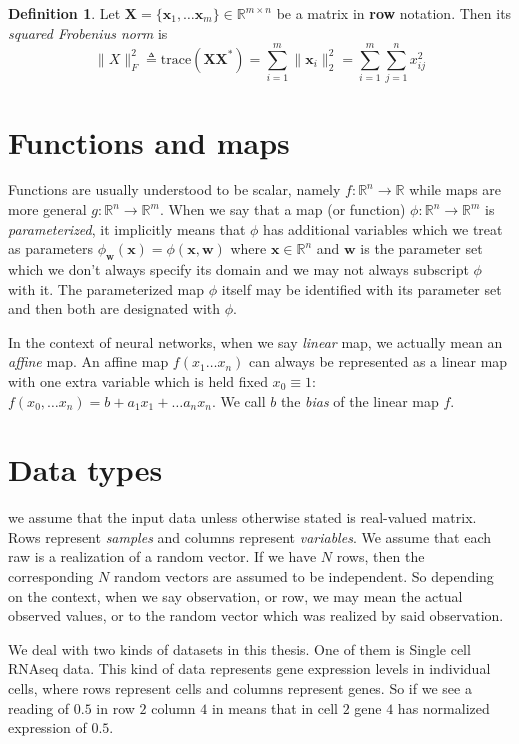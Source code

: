 \documentclass[11pt, a4paper]{report}
\theoremstyle{plain}
\theoremstyle{definition}
\newtheorem{mydef}{Definition}[chapter]
\theoremstyle{remark}
\newcommand{\R}{\mathbb{R}}
\newcommand{\X}{\mathbf{X}}
\newcommand{\x}{\mathbf{x}}
\newcommand{\w}{\mathbf{w}}
\begin{document}
\begin{mydef}
Let $\X = \{\x_1, \dots \x_m\} \in \R^{m \times n}$
be a matrix in \textbf{row} notation. Then its \emph{squared Frobenius norm} is
\begin{equation}
\label{def:frobnorm}
\|X\|_F^2 \triangleq \text{trace}(\X \X^*) 
= \sum_{i=1}^{m} \|\x_i\|^2_2 = \sum_{i=1}^m \sum_{j=1}^n x_{ij}^2
\end{equation}
\end{mydef}



\section{Functions and maps}
\label{seq:functions}
Functions are usually understood to be scalar, namely $f:\R^n \to \R$ while maps
are more general $g:\R^n \to \R^m$. When we say that a map (or function) $\phi
:\R^n \to \R^m$ is \emph{parameterized}, it implicitly means that $\phi$ has additional 
variables which we treat as parameters $\phi_{\w}(\x) = \phi(\x, \w)$ where $\x \in \R^n$
and $\w$ is the parameter set which we don't always specify its domain and we may not
always subscript $\phi$ with it. The parameterized map $\phi$ itself may be
identified with its parameter set and then both are designated with $\phi$.

In the context of neural networks, when we say \emph{linear} map, we actually mean an
\emph{affine} map.
An affine map $f(x_1 \dots x_n)$ can always be represented as a linear map with one extra variable 
which is held fixed $x_0 \equiv 1$: $f(x_0, \dots x_n) = b + a_1 x_1 + \dots a_n
x_n$. We call $b$ the \emph{bias} of the linear map $f$.
\label{affinelinear}

\section{Data types}
we assume that the input data unless otherwise stated is real-valued matrix.
Rows represent \emph{samples} and columns represent \emph{variables}. We assume
that each raw is a realization of a random vector. If we have $N$ rows, then the
corresponding $N$ random vectors are assumed to be independent. So depending on
the context, when we say observation, or row, we may mean the actual observed
values, or to the random vector which was realized by said observation.

We deal with two kinds of datasets in this thesis. One of them is
Single cell RNAseq data. This kind of data represents gene expression levels in 
individual cells, where rows represent cells and columns represent genes.
So if we see a reading of
$0.5$ in row $2$ column $4$ in means that in cell $2$ gene $4$ has normalized
expression of $0.5$.
\end{document}
